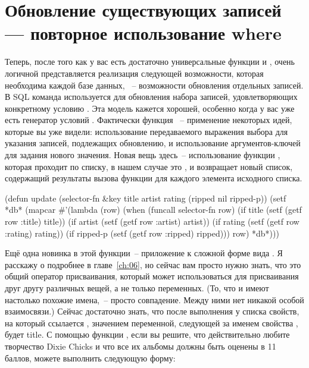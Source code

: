 \section{Обновление существующих записей — повторное использование where}

Теперь, после того как у вас есть достаточно универсальные функции  и
, очень логичной представляется реализация следующей возможности, которая
необходима каждой базе данных, ~-- возможности обновления отдельных записей. В SQL команда
 используется для обновления набора записей, удовлетворяющих конкретному
условию . Эта модель кажется хорошей, особенно когда у вас уже есть генератор
условий . Фактически функция ~-- применение некоторых идей,
которые вы уже видели: использование передаваемого выражения выбора для указания записей,
подлежащих обновлению, и использование аргументов-ключей для задания нового
значения. Новая вещь здесь~-- использование функции , которая проходит по
списку, в нашем случае это , и возвращает новый список, содержащий результаты
вызова функции для каждого элемента исходного списка.

\begin{myverb}
(defun update (selector-fn &key title artist rating (ripped nil ripped-p))
  (setf *db*
        (mapcar
         #'(lambda (row)
             (when (funcall selector-fn row)
               (if title    (setf (getf row :title) title))
               (if artist   (setf (getf row :artist) artist))
               (if rating   (setf (getf row :rating) rating))
               (if ripped-p (setf (getf row :ripped) ripped)))
             row) *db*)))
\end{myverb}

Ещё одна новинка в этой функции~-- приложение  к
сложной форме вида . Я расскажу о  подробнее в главе~\ref{ch:06},
но сейчас вам просто нужно знать, что это общий оператор присваивания, который может
использоваться для присваивания друг другу различных вещей, а не только переменных. (То,
что  и  имеют настолько похожие имена,~-- просто совпадение. Между
ними нет никакой особой взаимосвязи.) Сейчас достаточно знать, что после выполнения
 у списка свойств, на который ссылается ,
значением переменной, следующей за именем свойства , будет title. С помощью
функции , если вы решите, что действительно любите творчество Dixie Chicks и
что все их альбомы должны быть оценены в 11 баллов, можете выполнить следующую
форму:

